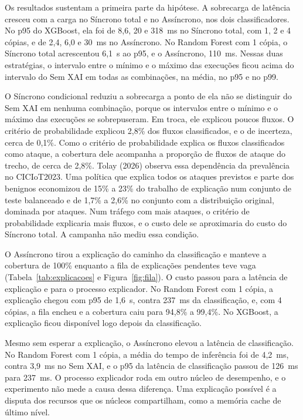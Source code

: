 \documentclass[
  article,
  12pt,
  oneside,
  a4paper,
  english,
  brazil
]{abntex2}
\begin{document}
Os resultados sustentam a primeira parte da hipótese. A sobrecarga de latência cresceu com a carga
no Síncrono total e no Assíncrono, nos dois classificadores. No p95 do XGBoost,
ela foi de 8,6, 20 e 318~ms no Síncrono total, com 1, 2 e 4 cópias, e de 2,4, 6,0 e 30~ms no
Assíncrono. No Random Forest com 1 cópia, o Síncrono total acrescentou 6,1~s ao p95, e o Assíncrono,
110~ms. Nessas duas estratégias, o intervalo entre o mínimo e o máximo das execuções ficou acima do
intervalo do Sem XAI em todas as combinações, na média, no p95 e no p99.

O Síncrono condicional reduziu a sobrecarga a ponto de ela não se distinguir do Sem XAI em nenhuma
combinação, porque os intervalos entre o mínimo e o máximo das execuções se sobrepuseram. Em troca,
ele explicou poucos fluxos. O critério de probabilidade explicou 2,8\% dos fluxos classificados, e o
de incerteza, cerca de 0,1\%. Como o critério de probabilidade explica os fluxos classificados como
ataque, a cobertura dele acompanha a proporção de fluxos de ataque do trecho, de cerca de 2,8\%.
Tolay (2026) observa essa dependência da prevalência no CICIoT2023. Uma política que explica todos os
ataques previstos e parte dos benignos economizou de 15\% a 23\% do trabalho de explicação num
conjunto de teste balanceado e de 1,7\% a 2,6\% no conjunto com a distribuição original, dominada
por ataques. Num tráfego com mais ataques, o critério de probabilidade explicaria mais fluxos, e o
custo dele se aproximaria do custo do Síncrono total. A campanha não mediu essa condição.

O Assíncrono tirou a explicação do caminho da classificação e manteve a cobertura de 100\% enquanto
a fila de explicações pendentes teve vaga (Tabela~\ref{tab:explicacoes} e Figura~\ref{fig:fila}). O
custo passou para a latência de explicação e para o processo explicador. No Random Forest com 1
cópia, a explicação chegou com p95 de 1,6~s, contra 237~ms da classificação, e, com 4 cópias, a fila
encheu e a cobertura caiu para 94,8\% a 99,4\%. No XGBoost, a explicação ficou disponível logo
depois da classificação.

Mesmo sem esperar a explicação, o Assíncrono elevou a latência de classificação. No Random Forest com
1 cópia, a média do tempo de inferência foi de 4,2~ms, contra 3,9~ms no Sem XAI, e o p95 da latência
de classificação passou de 126~ms para 237~ms. O processo explicador roda em outro núcleo de
desempenho, e o experimento não mede a causa dessa diferença. Uma explicação possível é a disputa
dos recursos que os núcleos compartilham, como a memória cache de último nível.
\end{document}
